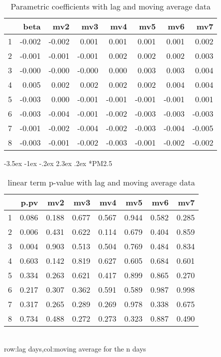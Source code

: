 \documentclass[a4paper, 12pt]{article}
\makeatletter
\def\large{\fontsize{14}{20}\selectfont}
\renewcommand\subsection{\@startsection {subsection}{1}{\z@}%
                                   {-3.5ex \@plus -1ex \@minus -.2ex}%
                                   {2.3ex \@plus.2ex}%
                                   {\centering\normalfont\large\bfseries}}
\makeatother
\begin{document}
\begin{table}[h]
\centering
\caption{Parametric coefficients with lag and moving average data}
\begin{tabular}{rrrrrrrr}
  \hline
 & beta & mv2 & mv3 & mv4 & mv5 & mv6 & mv7 \\
  \hline
1 & -0.002 & -0.002 & 0.001 & 0.001 & 0.001 & 0.001 & 0.002 \\
  2 & -0.001 & -0.001 & -0.001 & 0.002 & 0.002 & 0.002 & 0.003 \\
  3 & -0.000 & -0.000 & -0.000 & 0.000 & 0.003 & 0.003 & 0.004 \\
  4 & 0.005 & 0.002 & 0.002 & 0.002 & 0.002 & 0.004 & 0.004 \\
  5 & -0.003 & 0.000 & -0.001 & -0.001 & -0.001 & -0.001 & 0.001 \\
  6 & -0.003 & -0.004 & -0.001 & -0.002 & -0.003 & -0.003 & -0.003 \\
  7 & -0.001 & -0.002 & -0.004 & -0.002 & -0.003 & -0.004 & -0.005 \\
  8 & -0.003 & -0.001 & -0.002 & -0.003 & -0.001 & -0.002 & -0.002 \\
   \hline
\end{tabular}
\end{table}
\clearpage
\subsection*{PM2.5}
\begin{table}[h]
\centering
\caption{linear term p-value with lag and moving average data}
\begin{tabular}{rrrrrrrr}
  \hline
 & p.pv & mv2 & mv3 & mv4 & mv5 & mv6 & mv7 \\
  \hline
1 & 0.086 & 0.188 & 0.677 & 0.567 & 0.944 & 0.582 & 0.285 \\
  2 & 0.006 & 0.431 & 0.622 & 0.114 & 0.679 & 0.404 & 0.859 \\
  3 & 0.004 & 0.903 & 0.513 & 0.504 & 0.769 & 0.484 & 0.834 \\
  4 & 0.603 & 0.142 & 0.819 & 0.627 & 0.605 & 0.684 & 0.601 \\
  5 & 0.334 & 0.263 & 0.621 & 0.417 & 0.899 & 0.865 & 0.270 \\
  6 & 0.217 & 0.307 & 0.362 & 0.591 & 0.589 & 0.987 & 0.998 \\
  7 & 0.317 & 0.265 & 0.289 & 0.269 & 0.978 & 0.338 & 0.675 \\
  8 & 0.734 & 0.488 & 0.272 & 0.273 & 0.323 & 0.887 & 0.490 \\
   \hline
\end{tabular}
\\row:lag days,col:moving average for the n days
\end{table}
\end{document}
